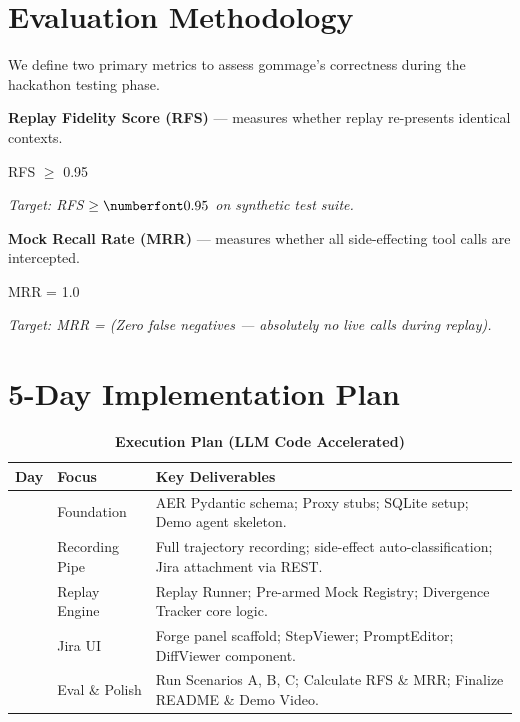 \documentclass[11pt, a4paper]{article}
\begin{document}
\section{Evaluation Methodology}

We define two primary metrics to assess gommage's correctness during the hackathon testing phase.

\begin{tcolorbox}[metricbox]
  \textbf{\titlefont\large Replay Fidelity Score (RFS)} — measures whether replay re-presents identical contexts.
  \begin{center}
    {\numberfont\Large RFS $\geq$ 0.95}
  \end{center}
  \textit{Target: RFS $\geq \numberfont 0.95$ \dialogfont on synthetic test suite.}
\end{tcolorbox}

\vspace{0.2em}

\begin{tcolorbox}[metricbox]
  \textbf{\titlefont\large Mock Recall Rate (MRR)} — measures whether all side-effecting tool calls are intercepted.
  \begin{center}
    {\numberfont\Large MRR = 1.0}
  \end{center}
  \textit{Target: MRR =  \dialogfont (Zero false negatives — absolutely no live calls during replay).}
\end{tcolorbox}

\section{5-Day Implementation Plan}

\begin{table}[h!]
  \centering\dialogfont\color{purewhite}
  \caption*{\color{purewhite}\textbf{\titlefont Execution Plan (LLM Code Accelerated)}}
  \begin{tabularx}{\textwidth}{@{} C{1.2cm} L{3.5cm} L{10cm} @{}}
    \toprule
    \textbf{\titlefont Day} & \textbf{\titlefont Focus} & \textbf{\titlefont Key Deliverables} \\
    \midrule
    \textbf{} & Foundation & AER Pydantic schema; Proxy stubs; SQLite setup; Demo agent skeleton. \\
    \textbf{} & Recording Pipe & Full trajectory recording; side-effect auto-classification; Jira attachment via REST. \\
    \textbf{} & Replay Engine & Replay Runner; Pre-armed Mock Registry; Divergence Tracker core logic. \\
    \textbf{} & Jira UI & Forge panel scaffold; StepViewer; PromptEditor; DiffViewer component. \\
    \textbf{} & Eval \& Polish & Run Scenarios A, B, C; Calculate RFS \& MRR; Finalize README \& Demo Video. \\
    \bottomrule
  \end{tabularx}
\end{table}
\end{document}

